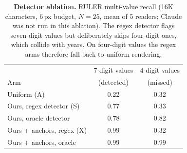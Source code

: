 \begin{table}[!htbp]
\centering
\caption{\textbf{Detector ablation.} RULER multi-value recall (16K characters, 6\,px budget, $N{=}25$, mean of 5 readers; Claude was not run in this ablation). The regex detector flags seven-digit values but deliberately skips four-digit ones, which collide with years. On four-digit values the regex arms therefore fall back to uniform rendering.}
\label{tab:detector}
\small
\setlength{\tabcolsep}{5pt}
\begin{tabular}{l cc}
\toprule
& 7-digit values & 4-digit values \\
Arm & (detected) & (missed) \\
\midrule
Uniform (A) & 0.22 & 0.32 \\
\midrule
Ours, regex detector (S) & 0.77 & 0.33 \\
Ours, oracle detector & 0.78 & 0.82 \\
Ours + anchors, regex (X) & 0.99 & 0.32 \\
Ours + anchors, oracle & 0.99 & 0.99 \\
\bottomrule
\end{tabular}
\end{table}
